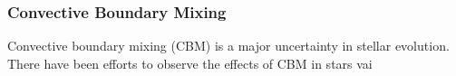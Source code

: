 {\color{purple}
\subsubsection{Convective Boundary Mixing}
}

Convective boundary mixing (CBM) is a major uncertainty in stellar evolution. There have been efforts to observe the effects of CBM in stars vai 

